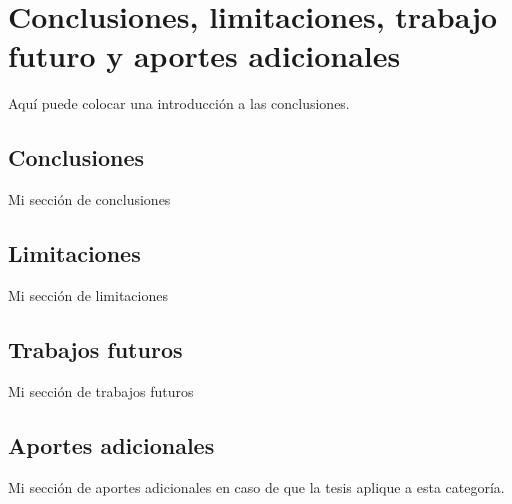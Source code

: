 \def\baselinestretch{1}
\chapter{Conclusiones, limitaciones, trabajo futuro y aportes adicionales}
\ifpdf
    \graphicspath{{Conclusions/ConclusionsFigs/PNG/}{Conclusions/ConclusionsFigs/PDF/}{Conclusions/ConclusionsFigs/}}
\else
    \graphicspath{{Conclusions/ConclusionsFigs/EPS/}{Conclusions/ConclusionsFigs/}}
\fi

\def\baselinestretch{1.66}

Aquí puede colocar una introducción a las conclusiones.

\section{Conclusiones}

Mi sección de conclusiones

\section{Limitaciones}

Mi sección de limitaciones

\section{Trabajos futuros}

Mi sección de trabajos futuros

\section{Aportes adicionales}

Mi sección de aportes adicionales en caso de que la tesis aplique a esta categoría.



